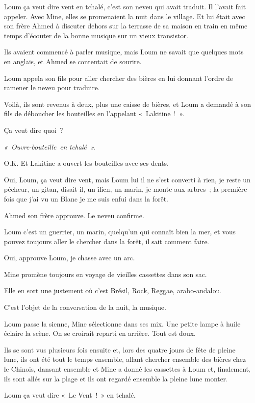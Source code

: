 \documentclass[twoside]{book} %
\begin{document}
\noindent Loum ça veut dire vent en tchalé, c’est son neveu qui avait traduit. Il l’avait fait appeler. Avec Mine, elles se promenaient la nuit dans le village. Et lui était avec son frère Ahmed à discuter dehors sur la terrasse de sa maison en train en même temps d’écouter de la bonne musique sur un vieux transistor.\par
Ils avaient commencé à parler musique, mais Loum ne savait que quelques mots en anglais, et Ahmed se contentait de sourire.\par
Loum appela son fils pour aller chercher des bières en lui donnant l’ordre de ramener le neveu pour traduire.\par
Voilà, ils sont revenus à deux, plus une caisse de bières, et Loum a demandé à son fils de déboucher les bouteilles en l’appelant « Lakitine ! ».\par
Ça veut dire quoi ?\par
\emph{« Ouvre-bouteille en tchalé ».}\par
O.K. Et Lakitine a ouvert les bouteilles avec ses dents.\par
Oui, Loum, ça veut dire vent, mais Loum lui il ne s’est converti à rien, je reste un pêcheur, un gitan, disait-il, un îlien, un marin, je monte aux arbres ; la première fois que j’ai vu un Blanc je me suis enfui dans la forêt.\par
Ahmed son frère approuve. Le neveu confirme.\par
Loum c’est un guerrier, un marin, quelqu’un qui connaît bien la mer, et vous pouvez toujours aller le chercher dans la forêt, il sait comment faire.\par
Oui, approuve Loum, je chasse avec un arc.\par
Mine promène toujours en voyage de vieilles cassettes dans son sac.\par
Elle en sort une justement où c’est Brésil, Rock, Reggae, arabo-andalou.\par
C’est l’objet de la conversation de la nuit, la musique.\par
Loum passe la sienne, Mine sélectionne dans ses mix. Une petite lampe à huile éclaire la scène. On se croirait reparti en arrière. Tout est doux.\par
Ils se sont vus plusieurs fois ensuite et, lors des quatre jours de fête de pleine lune, ils ont été tout le temps ensemble, allant chercher ensemble des bières chez le Chinois, dansant ensemble et Mine a donné les cassettes à Loum et, finalement, ils sont allés sur la plage et ils ont regardé ensemble la pleine lune monter.\par
Loum ça veut dire « Le Vent ! » en tchalé.
\end{document}

